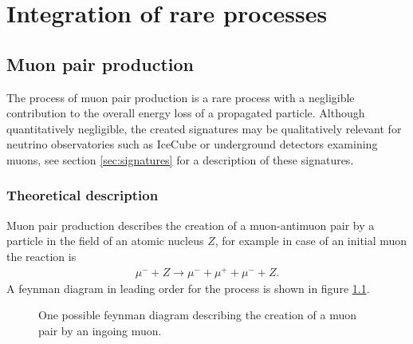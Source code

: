 \chapter{Integration of rare processes}

\section{Muon pair production}

The process of muon pair production is a rare process with a negligible contribution to the overall energy loss of a propagated particle.
Although quantitatively negligible, the created signatures may be qualitatively relevant for neutrino observatories such as IceCube or underground detectors examining muons, see section \ref{sec:signatures} for a description of these signatures.

\subsection{Theoretical description}

Muon pair production describes the creation of a muon-antimuon pair by a particle in the field of an atomic nucleus $Z$, for example in case of an initial muon the reaction is
\begin{align*}
    \mu^- + Z \rightarrow \mu^- + \mu^+ + \mu^- + Z.
\end{align*}
A feynman diagram in leading order for the process is shown in figure \ref{fig:feynman_mupair}.

\begin{figure}
	\centering
	
    \caption{One possible feynman diagram describing the creation of a muon pair by an ingoing muon.}
    \label{fig:feynman_mupair}
\end{figure}

